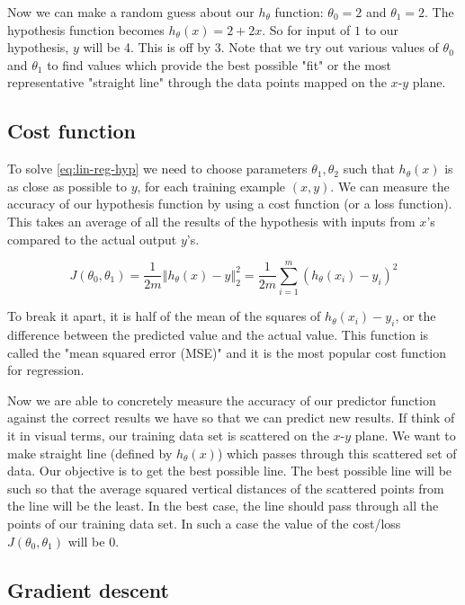 \documentclass[a4paper,11pt]{report}
\newcommand{\norm}[1]{\left\Vert#1\right\Vert}
\newcommand{\ds}{\displaystyle}
\begin{document}
Now we can make a random guess about our $h_\theta$ function: $\theta_0 = 2$ and $\theta_1 = 2$. The hypothesis function becomes $h_\theta(x) = 2 + 2x$.
So for input of $1$ to our hypothesis, $y$ will be 4. This is off by $3$. Note that we try out various values of $\theta_0$ and $\theta_1$ to find values which provide the best possible "fit" or the most representative "straight line" through the data points mapped on the $x$-$y$ plane.

\subsection*{Cost function}

To solve \eqref{eq:lin-reg-hyp} we need to choose parameters $\theta_1, \theta_2$ such that $h_\theta(x)$ is as close as possible to $y$, for each training example $(x, y)$.
We can measure the accuracy of our hypothesis function by using a cost function (or a loss function).
This takes an average of all the results of the hypothesis with inputs from $x$'s compared to the actual output $y$'s.

\begin{equation}\label{eq:lin-reg-cost}
J(\theta_0, \theta_1) = \dfrac{1}{2m} \ds\norm{h_\theta(x) - y}_2^2  = \dfrac{1}{2m}\ds \sum_{i=1}^m \left(h_\theta(x_{i}) - y_{i}\right)^2
\end{equation}

To break it apart, it is half of the mean of the squares of $h_\theta(x_{i}) - y_{i}$, or the difference between the predicted value and the actual value. This function is called the "mean squared error (MSE)" and it is the most popular cost function for regression.

Now we are able to concretely measure the accuracy of our predictor function against the correct results we have so that we can predict new results.
If think of it in visual terms, our training data set is scattered on the $x$-$y$ plane. We want to make straight line (defined by $h_\theta(x)$) which passes through this scattered set of data. Our objective is to get the best possible line. The best possible line will be such so that the average squared vertical distances of the scattered points from the line will be the least. In the best case, the line should pass through all the points of our training data set. In such a case the value of the cost/loss $J(\theta_0, \theta_1)$ will be 0.

\subsection*{Gradient descent}
\end{document}
